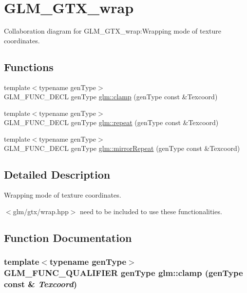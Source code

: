 \hypertarget{group__gtx__wrap}{
\section{GLM\_\-GTX\_\-wrap}
\label{group__gtx__wrap}
}


Collaboration diagram for GLM\_\-GTX\_\-wrap:Wrapping mode of texture coordinates.  
\subsection*{Functions}
\begin{CompactItemize}
\item 
{\footnotesize template$<$typename genType$>$ }\\GLM\_\-FUNC\_\-DECL genType \hyperlink{group__gtx__wrap_g18e81aeb796ba941505bb883f1efd586}{glm::clamp} (genType const \&Texcoord)
\item 
{\footnotesize template$<$typename genType$>$ }\\GLM\_\-FUNC\_\-DECL genType \hyperlink{group__gtx__wrap_g0e136d75883428ad7d9c19611290d77a}{glm::repeat} (genType const \&Texcoord)
\item 
{\footnotesize template$<$typename genType$>$ }\\GLM\_\-FUNC\_\-DECL genType \hyperlink{group__gtx__wrap_g03ce460f4f1bbc3058ce0d4928e29071}{glm::mirrorRepeat} (genType const \&Texcoord)
\end{CompactItemize}


\subsection{Detailed Description}
Wrapping mode of texture coordinates. 

$<$glm/gtx/wrap.hpp$>$ need to be included to use these functionalities. 

\subsection{Function Documentation}
\hypertarget{group__gtx__wrap_g18e81aeb796ba941505bb883f1efd586}{
\subsubsection[clamp]{\setlength{\rightskip}{0pt plus 5cm}template$<$typename genType$>$ GLM\_\-FUNC\_\-QUALIFIER genType glm::clamp (genType const \& {\em Texcoord})}}
\label{group__gtx__wrap_g18e81aeb796ba941505bb883f1efd586}


